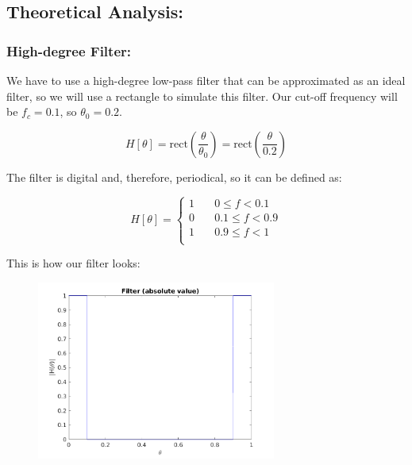 \documentclass[a4paper,11pt]{article}
\begin{document}
\newpage

\subsection{Theoretical Analysis:}

\subsubsection{High-degree Filter:}

We have to use a high-degree low-pass filter that can be approximated as an
ideal filter, so we will use a rectangle to simulate this filter. Our cut-off
frequency will be $f_c = 0.1$, so $\theta_0 = 0.2$.

\begin{equation}\label{eq:High_Filter}
  H[\theta] = \text{rect}(\frac{\theta}{\theta_0}) = \text{rect}
  (\frac{\theta}{0.2})
\end{equation}

The filter is digital and, therefore, periodical, so it can be defined as:

\begin{equation}\label{eq:H_hd_th}
  H[\theta] =
   \begin{cases}
       1 &\quad 0 \le f < 0.1\\
       0 &\quad 0.1 \le f < 0.9\\
       1 &\quad 0.9 \le f < 1\\
   \end{cases}
\end{equation}

This is how our filter looks:

\begin{figure}[!hp]
    \begin{center}
      \includegraphics[width=0.7\textwidth]{images/study1/H_hd_th.png}
    \end{center}
\end{figure}
\end{document}
